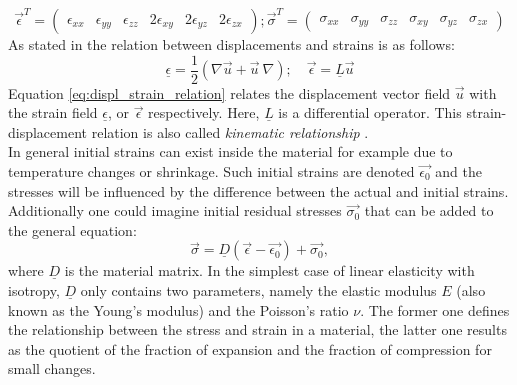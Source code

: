  \begin{equation}
 \vec{\epsilon}^T = \begin{pmatrix}
 \epsilon_{xx} & \epsilon_{yy} & \epsilon_{zz} & 2\epsilon_{xy} & 2\epsilon_{yz} & 2\epsilon_{zx} \end{pmatrix};
 \vec{\sigma}^T = \begin{pmatrix}
 \sigma_{xx} & \sigma_{yy} & \sigma_{zz} & \sigma_{xy} & \sigma_{yz} & \sigma_{zx} \end{pmatrix}
 \end{equation}
 As stated in \cite{steinke2005finite} the relation between displacements and strains is as follows:
 \begin{equation}\label{eq:displ_strain_relation}
 \underline{\epsilon} = \frac{1}{2}\left(\nabla\vec{u} + \vec{u}\:\nabla \right);\quad \vec{\epsilon}
 = \underline{L}\vec{u}
 \end{equation}
 Equation \ref{eq:displ_strain_relation} relates the displacement vector field $\vec{u}$ with the strain field $\underline{\epsilon}$, or $\vec{\epsilon}$ respectively. Here, $\underline{L}$ is a differential operator. This strain-displacement relation is also called \textit{kinematic relationship} \cite{steinke2005finite}.\\
 In general initial strains can exist inside the material for example due to temperature changes or shrinkage. Such initial strains are denoted $\vec{\epsilon_0}$ and the stresses will be influenced by the difference between the actual and initial strains. Additionally one could imagine initial residual stresses $\vec{\sigma_0}$ that can be added to the general equation:
 \begin{equation}\label{eq:stress-strain-relation}
 \vec{\sigma} = \underline{D}\left(\vec{\epsilon}-\vec{\epsilon_0}\right)+\vec{\sigma_0},
 \end{equation}
 where $\underline{D}$ is the material matrix. In the simplest case of linear elasticity with isotropy, $\underline{D}$ only contains two parameters, namely the elastic modulus $E$ (also known as the Young's modulus) and the Poisson's ratio $\nu$. The former one defines the relationship between the stress and strain in a material, the latter one results as the quotient of the fraction of expansion and the fraction of compression for small changes.

